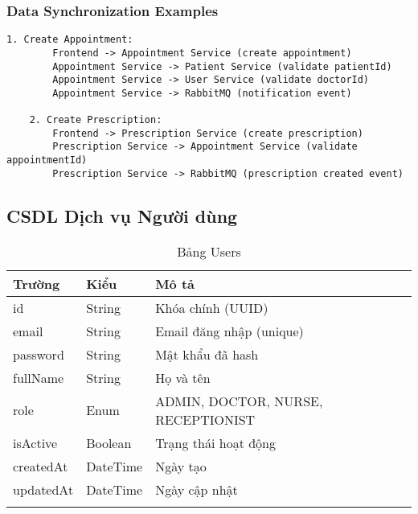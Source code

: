 \documentclass[12pt,a4paper]{report}
\begin{document}
    \subsubsection{Data Synchronization Examples}
    \begin{lstlisting}[language=text, caption=Example data flow between services]
    1. Create Appointment:
        Frontend -> Appointment Service (create appointment)
        Appointment Service -> Patient Service (validate patientId)
        Appointment Service -> User Service (validate doctorId)
        Appointment Service -> RabbitMQ (notification event)

    2. Create Prescription:
        Frontend -> Prescription Service (create prescription)
        Prescription Service -> Appointment Service (validate appointmentId)
        Prescription Service -> RabbitMQ (prescription created event)
    \end{lstlisting}

    \subsection{CSDL Dịch vụ Người dùng}
    \begin{longtable}{|p{3cm}|p{2cm}|p{8cm}|}
    \hline
    \textbf{Trường} & \textbf{Kiểu} & \textbf{Mô tả} \\
    \hline
    id & String & Khóa chính (UUID) \\
    \hline
    email & String & Email đăng nhập (unique) \\
    \hline
    password & String & Mật khẩu đã hash \\
    \hline
    fullName & String & Họ và tên \\
    \hline
    role & Enum & ADMIN, DOCTOR, NURSE, RECEPTIONIST \\
    \hline
    isActive & Boolean & Trạng thái hoạt động \\
    \hline
    createdAt & DateTime & Ngày tạo \\
    \hline
    updatedAt & DateTime & Ngày cập nhật \\
    \hline
    \caption{Bảng Users}
    \end{longtable}
\end{document}
